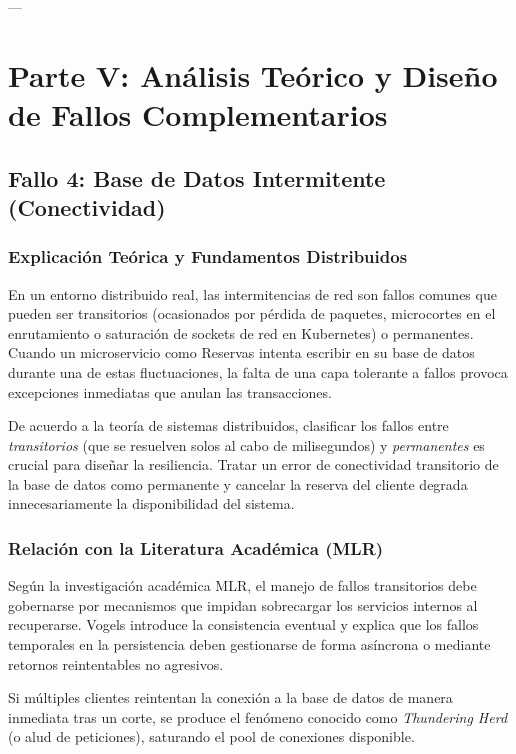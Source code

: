 \documentclass[12pt,letterpaper]{article}
\begin{document}
---

\section{Parte V: Análisis Teórico y Diseño de Fallos Complementarios}

\subsection{Fallo 4: Base de Datos Intermitente (Conectividad)}

\subsubsection{Explicación Teórica y Fundamentos Distribuidos}
En un entorno distribuido real, las intermitencias de red son fallos comunes que pueden ser transitorios (ocasionados por pérdida de paquetes, microcortes en el enrutamiento o saturación de sockets de red en Kubernetes) o permanentes. Cuando un microservicio como Reservas intenta escribir en su base de datos durante una de estas fluctuaciones, la falta de una capa tolerante a fallos provoca excepciones inmediatas que anulan las transacciones.

De acuerdo a la teoría de sistemas distribuidos, clasificar los fallos entre \textit{transitorios} (que se resuelven solos al cabo de milisegundos) y \textit{permanentes} es crucial para diseñar la resiliencia. Tratar un error de conectividad transitorio de la base de datos como permanente y cancelar la reserva del cliente degrada innecesariamente la disponibilidad del sistema.

\subsubsection{Relación con la Literatura Académica (MLR)}
Según la investigación académica MLR, el manejo de fallos transitorios debe gobernarse por mecanismos que impidan sobrecargar los servicios internos al recuperarse. Vogels \cite{vogels} introduce la consistencia eventual y explica que los fallos temporales en la persistencia deben gestionarse de forma asíncrona o mediante retornos reintentables no agresivos. 

Si múltiples clientes reintentan la conexión a la base de datos de manera inmediata tras un corte, se produce el fenómeno conocido como \textit{Thundering Herd} (o alud de peticiones), saturando el pool de conexiones disponible.
\end{document}
